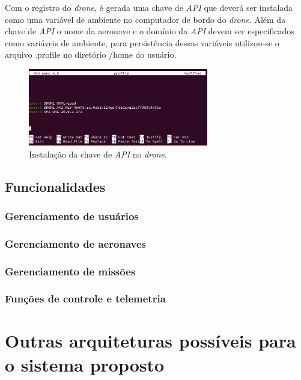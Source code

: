 \documentclass[12pt,a4paper,oneside]{book}
\begin{document}
%
Com o registro do \textit{drone}, é gerada uma chave de \textit{API} que deverá ser instalada como uma variável de ambiente no computador de bordo do \textit{drone}. Além da chave de \textit{API} o nome da aeronave e o domínio da \textit{API} devem ser especificados como variáveis de ambiente, para persistência dessas variáveis utilizou-se o arquivo .profile no diretório /home do usuário.
%
\begin{figure}[!htbp]
  \centering
  \includegraphics[width=0.7\textwidth]{Images/Desenvolvimento/drone_api_key.png}
  \caption{Instalação da chave de \textit{API} no \textit{drone}.}
  \label{fig:drone_api_key.png.0}
\end{figure}
%
\subsection{Funcionalidades}

\subsubsection{Gerenciamento de usuários}

\subsubsection{Gerenciamento de aeronaves}

\subsubsection{Gerenciamento de missões}

\subsubsection{Funções de controle e telemetria}


\section{Outras arquiteturas possíveis para o sistema proposto}
\end{document}
